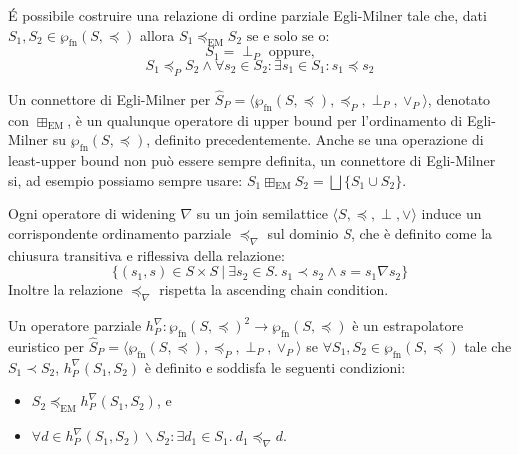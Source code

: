\begin{definition} \label{def:EgliMilnerRelation}
\'E possibile costruire una relazione di ordine parziale Egli-Milner tale che, dati \(S_1, S_2\in\wp_{\textrm{fn}}(S, \preceq)\) allora \(S_1 \preceq_{\textrm{EM}} S_2 \textrm{ se e solo se o:} \)
\[S_1=\perp_P\textrm{ oppure,}\]
\[S_1\preceq_P S_2 \wedge \forall s_2\in S_2 : \exists s_1\in S_1: s_1\preceq s_2\]
\end{definition}

\begin{definition}\label{def:connettoreEgliMilner}
Un connettore di Egli-Milner per \(\hat{S}_P = \langle \wp_{\textrm{fn}}(S, \preceq),\preceq_P, \perp_P ,\vee_P\rangle\), denotato con \(\boxplus_{\textrm{EM}}\), è un qualunque operatore di upper bound per l'ordinamento di Egli-Milner su \(\wp_{\textrm{fn}}(S, \preceq)\), definito precedentemente. Anche se una operazione di least-upper bound non può essere sempre definita, un connettore di Egli-Milner si, ad esempio possiamo sempre usare: \(S_1\boxplus_{\textrm{EM}} S_2 = \bigsqcup\{ S_1 \cup S_2\}\).
\end{definition}

\begin{definition} 
Ogni operatore di widening \(\nabla\) su un join semilattice \(\langle S,\preceq, \perp ,\vee\rangle\) induce un corrispondente ordinamento parziale \(\preceq_{\nabla}\) sul dominio \emph{S}, che è definito come la chiusura transitiva e riflessiva della relazione:
\[\lbrace(s_1, s)\in S\times S\ \vert\ \exists s_2\in S.\ s_1\prec s_2 \wedge s = s_1\nabla s_2\rbrace\]
Inoltre la relazione \(\preceq_{\nabla}\) rispetta la ascending chain condition.
\end{definition}

\begin{definition}
Un operatore parziale \(h_{P}^{\nabla} : \wp_{\textrm{fn}}(S, \preceq)^2\rightarrow\wp_{\textrm{fn}}(S, \preceq)\) è un estrapolatore euristico per \(\hat{S}_P = \langle \wp_{\textrm{fn}}(S, \preceq),\preceq_P, \perp_P ,\vee_P\rangle\) se \(\forall S_1, S_2\in\wp_{\textrm{fn}}(S, \preceq)\) tale che \(S_1 \prec S_2\), \(h_{P}^{\nabla}(S_1, S_2)\) è definito e soddisfa le seguenti condizioni:
\begin{itemize}
	\item \(S_2 \preceq_{\textrm{EM}}h_{P}^{\nabla}(S_1, S_2)\), e
	\item \(\forall d \in h_{P}^{\nabla}(S_1, S_2)\backslash S_2 : \exists d_1\in S_1.\ d_1\preceq_{\nabla} d\).
\end{itemize}
\end{definition}

